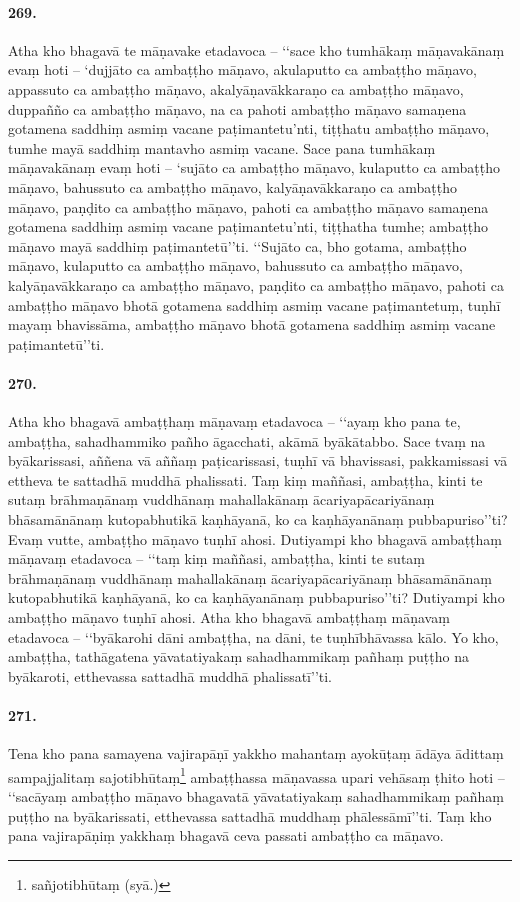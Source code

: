 \paragraph{269.} Atha kho bhagavā te māṇavake etadavoca – ‘‘sace kho tumhākaṃ māṇavakānaṃ evaṃ hoti – ‘dujjāto ca ambaṭṭho māṇavo, akulaputto ca ambaṭṭho māṇavo, appassuto ca ambaṭṭho māṇavo, akalyāṇavākkaraṇo ca ambaṭṭho māṇavo, duppañño ca ambaṭṭho māṇavo, na ca pahoti ambaṭṭho māṇavo samaṇena gotamena saddhiṃ asmiṃ vacane paṭimantetu’nti, tiṭṭhatu ambaṭṭho māṇavo, tumhe mayā saddhiṃ mantavho asmiṃ vacane. Sace pana tumhākaṃ māṇavakānaṃ evaṃ hoti – ‘sujāto ca ambaṭṭho māṇavo, kulaputto ca ambaṭṭho māṇavo, bahussuto ca ambaṭṭho māṇavo, kalyāṇavākkaraṇo ca ambaṭṭho māṇavo, paṇḍito ca ambaṭṭho māṇavo, pahoti ca ambaṭṭho māṇavo samaṇena gotamena saddhiṃ asmiṃ vacane paṭimantetu’nti, tiṭṭhatha tumhe; ambaṭṭho māṇavo mayā saddhiṃ paṭimantetū’’ti. ‘‘Sujāto ca, bho gotama, ambaṭṭho māṇavo, kulaputto ca ambaṭṭho māṇavo, bahussuto ca ambaṭṭho māṇavo, kalyāṇavākkaraṇo ca ambaṭṭho māṇavo, paṇḍito ca ambaṭṭho māṇavo, pahoti ca ambaṭṭho māṇavo bhotā gotamena saddhiṃ asmiṃ vacane paṭimantetuṃ, tuṇhī mayaṃ bhavissāma, ambaṭṭho māṇavo bhotā gotamena saddhiṃ asmiṃ vacane paṭimantetū’’ti.

\paragraph{270.} Atha kho bhagavā ambaṭṭhaṃ māṇavaṃ etadavoca – ‘‘ayaṃ kho pana te, ambaṭṭha, sahadhammiko pañho āgacchati, akāmā byākātabbo. Sace tvaṃ na byākarissasi, aññena vā aññaṃ paṭicarissasi, tuṇhī vā bhavissasi, pakkamissasi vā ettheva te sattadhā muddhā phalissati. Taṃ kiṃ maññasi, ambaṭṭha, kinti te sutaṃ brāhmaṇānaṃ vuddhānaṃ mahallakānaṃ ācariyapācariyānaṃ bhāsamānānaṃ kutopabhutikā kaṇhāyanā, ko ca kaṇhāyanānaṃ pubbapuriso’’ti? Evaṃ vutte, ambaṭṭho māṇavo tuṇhī ahosi. Dutiyampi kho bhagavā ambaṭṭhaṃ māṇavaṃ etadavoca – ‘‘taṃ kiṃ maññasi, ambaṭṭha, kinti te sutaṃ brāhmaṇānaṃ vuddhānaṃ mahallakānaṃ ācariyapācariyānaṃ bhāsamānānaṃ kutopabhutikā kaṇhāyanā, ko ca kaṇhāyanānaṃ pubbapuriso’’ti? Dutiyampi kho ambaṭṭho māṇavo tuṇhī ahosi. Atha kho bhagavā ambaṭṭhaṃ māṇavaṃ etadavoca – ‘‘byākarohi dāni ambaṭṭha, na dāni, te tuṇhībhāvassa kālo. Yo kho, ambaṭṭha, tathāgatena yāvatatiyakaṃ sahadhammikaṃ pañhaṃ puṭṭho na byākaroti, etthevassa sattadhā muddhā phalissatī’’ti.

\paragraph{271.} Tena kho pana samayena vajirapāṇī yakkho mahantaṃ ayokūṭaṃ ādāya ādittaṃ sampajjalitaṃ sajotibhūtaṃ\footnote{sañjotibhūtaṃ (syā.)} ambaṭṭhassa māṇavassa upari vehāsaṃ ṭhito hoti – ‘‘sacāyaṃ ambaṭṭho māṇavo bhagavatā yāvatatiyakaṃ sahadhammikaṃ pañhaṃ puṭṭho na byākarissati, etthevassa sattadhā muddhaṃ phālessāmī’’ti. Taṃ kho pana vajirapāṇiṃ yakkhaṃ bhagavā ceva passati ambaṭṭho ca māṇavo.

